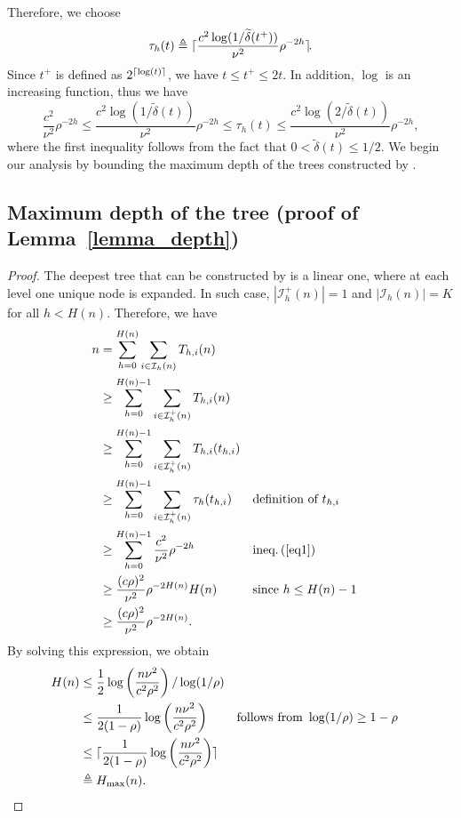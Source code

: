 Therefore, we choose
\[
\tau_h(t) \triangleq \lceil\frac{c^2\operatorname{log}(1/\widetilde{\delta}(t^+))}{\nu^2}\rho^{-2h}\rceil\!.
\]
Since $t^+$ is defined as $2^{\lceil\operatorname{log}(t)\rceil}$, we have $t \leq t^+ \leq 2t$. In addition, $\log$ is an increasing function, thus we have
\begin{equation} \label{eq1}
    \frac{c^2}{\nu^2}\rho^{-2h} \leq \frac{c^2 \operatorname{log}(1/\tilde{\delta}(t))}{\nu^2}\rho^{-2h} \leq \tau_h(t) \leq \frac{c^2\operatorname{log}(2/\tilde{\delta}(t))}{\nu^2}\rho^{-2h},
\end{equation}
where the first inequality follows from the fact that $0<\tilde{\delta}(t)\leq1/2$. We begin our analysis by bounding the maximum depth of the trees constructed by \HCT.

\subsection{Maximum depth of the tree (proof of Lemma~\ref{lemma_depth})}\label{proof:lemma_depth}
\restalemmadepth*

\begin{proof}
The deepest tree that can be constructed by \HCT is a linear one, where at each level one unique node is expanded. In such case,   $|\mathcal{I}_h^{+}(n)|=1$ and $|\mathcal{I}_h(n)|=K$ for all $h<H(n)$. Therefore, we have
\begin{align*}
    n & = \sum_{h=0}^{H(n)}\sum_{i\in\mathcal{I}_h(n)} T_{h,i}(n) \\
      & \geq \sum_{h=0}^{H(n)-1}\sum_{i\in\mathcal{I}_h^{+}(n)} T_{h,i}(n) \\
      & \geq \sum_{h=0}^{H(n)-1}\sum_{i\in\mathcal{I}_h^{+}(n)} T_{h,i}(t_{h,i}) \\
      & \geq \sum_{h=0}^{H(n)-1}\sum_{i\in\mathcal{I}_h^{+}(n)} \tau_h(t_{h,i}) && \text{definition of } t_{h,i} \\
      & \geq \sum_{h=0}^{H(n)-1}\frac{c^2}{\nu^2}\rho^{-2h} && \text{ineq.\,(\ref{eq1})} \\
      & \geq \frac{(c\rho)^2}{\nu^2}\rho^{-2H(n)}H(n) && \text{since } h\leq H(n)-1 \\
      & \geq \frac{(c\rho)^2}{\nu^2}\rho^{-2H(n)}.
\end{align*}
By solving this expression, we obtain
\begin{align*}
    H(n) & \leq \frac{1}{2}\operatorname{log}\left(                \frac{n\nu^2}{c^2\rho^2} \right)/\operatorname{log}(1/\rho) \\
         & \leq \frac{1}{2(1-\rho)}\operatorname{log}\left(
    \frac{n\nu^2}{c^2\rho^2} \right) && \text{follows from } \operatorname{log}(1/\rho)\geq 1-\rho \\
	& \leq \lceil\frac{1}{2(1-\rho)}\operatorname{log}\left(
    \frac{n\nu^2}{c^2\rho^2} \right)\rceil \\
         & \triangleq H_{\max}(n).
\end{align*}
\end{proof}

